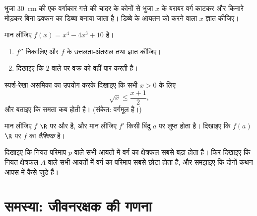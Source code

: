 \begin{exercise}[$\star\star$]\label{exo:g12:deriv:5}
भुजा $30\,$ cm की एक वर्गाकार गत्ते की चादर के कोनों से भुजा $x$ के बराबर
वर्ग काटकर और किनारे मोड़कर बिना ढक्कन का डिब्बा बनाया जाता है। डिब्बे के आयतन
को  करने वाला $x$ ज्ञात कीजिए।
\end{exercise}

\begin{exercise}[$\star\star$]\label{exo:g12:deriv:6}
मान लीजिए $f(x) = x^4 - 4x^3 + 10$ है।
\begin{enumerate}
  \item $f''$ निकालिए और $f$ के उत्तलता-अंतराल तथा 
        ज्ञात कीजिए।
  \item दिखाइए कि  $2$ वाले  पर  वक्र को
        वहीं पार करती है।
\end{enumerate}
\end{exercise}

\begin{exercise}[$\star\star$]\label{exo:g12:deriv:7}
स्पर्श-रेखा असमिका का उपयोग करके दिखाइए कि सभी $x > 0$ के लिए
\[
\sqrt{x} \leq \frac{x + 1}{2},
\]
और बताइए कि समता कब होती है। (संकेत: वर्गमूल  है।)
\end{exercise}

\begin{exercise}[$\star\star\star$]\label{exo:g12:deriv:8}
मान लीजिए $f$ $\R$ पर  और  है, और मान लीजिए $f'$ किसी बिंदु
$a$ पर लुप्त होता है। दिखाइए कि $f(a)$ $\R$ पर $f$ का \emph{वैश्विक}
 है।
\end{exercise}

\begin{exercise}[$\star\star\star$]\label{exo:g12:deriv:9}
दिखाइए कि नियत परिमाप $p$ वाले सभी आयतों में वर्ग का क्षेत्रफल सबसे बड़ा
होता है। फिर दिखाइए कि नियत क्षेत्रफल $A$ वाले सभी आयतों में वर्ग का परिमाप
सबसे छोटा होता है, और समझाइए कि दोनों कथन आपस में कैसे जुड़े हैं।
\end{exercise}

\section{समस्या: जीवनरक्षक की गणना}


